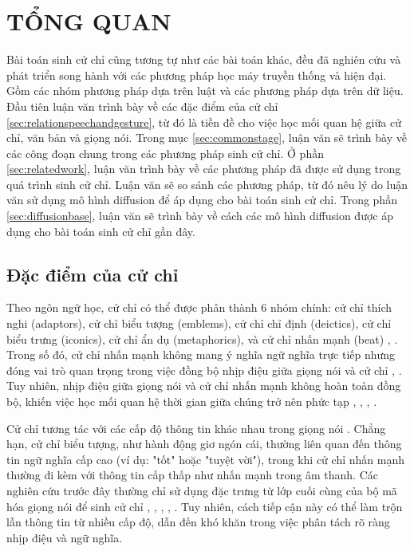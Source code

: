 \chapter{TỔNG QUAN}
\label{Chapter2}

Bài toán sinh cử chỉ cũng tương tự như các bài toán khác, đều đã nghiên cứu và phát triển song hành với các phương pháp học máy truyền thống và hiện đại. Gồm các nhóm phương pháp dựa trên luật và các phương pháp dựa trên dữ liệu.  Đầu tiên luận văn trình bày về các đặc điểm của cử chỉ \autoref{sec:relationspeechandgesture}, từ đó là tiền đề cho việc học mối quan hệ giữa cử chỉ, văn bản và giọng nói. Trong mục \autoref{sec:commonstage}, luận văn sẽ trình bày về các công đoạn chung trong các phương pháp sinh cử chỉ.
Ở phần \autoref{sec:relatedwork}, luận văn trình bày về các phương pháp đã được sử dụng trong quá trình sinh cử chỉ. Luận văn sẽ so sánh các phương pháp, từ đó nêu lý do luận văn sử dụng mô hình diffusion để áp dụng cho bài toán sinh cử chỉ.
Trong phần \autoref{sec:diffusionbase}, luận văn sẽ trình bày về cách các mô hình diffusion được áp dụng cho bài toán sinh cử chỉ gần đây.

\section{Đặc điểm của cử chỉ}
\label{sec:relationspeechandgesture}

Theo ngôn ngữ học, cử chỉ có thể được phân thành 6 nhóm chính: cử chỉ thích nghi (adaptors), cử chỉ biểu tượng (emblems), cử chỉ chỉ định (deictics), cử chỉ biểu trưng (iconics), cử chỉ ẩn dụ (metaphorics), và cử chỉ nhấn mạnh (beat) \cite{ekman1969repertoire}, \cite{sebeok2011advances}. Trong số đó, cử chỉ nhấn mạnh không mang ý nghĩa ngữ nghĩa trực tiếp nhưng đóng vai trò quan trọng trong việc đồng bộ nhịp điệu giữa giọng nói và cử chỉ \cite{kipp2005gesture}, \cite{sebeok2011advances}. Tuy nhiên, nhịp điệu giữa giọng nói và cử chỉ nhấn mạnh không hoàn toàn đồng bộ, khiến việc học mối quan hệ thời gian giữa chúng trở nên phức tạp \cite{mcclave1994gestural}, \cite{bhattacharya2021speech2affectivegestures}, \cite{kucherenko2020gesticulator}, \cite{yoon2020speech}.

Cử chỉ tương tác với các cấp độ thông tin khác nhau trong giọng nói \cite{sebeok2011advances}. Chẳng hạn, cử chỉ biểu tượng, như hành động giơ ngón cái, thường liên quan đến thông tin ngữ nghĩa cấp cao (ví dụ: "tốt" hoặc "tuyệt vời"), trong khi cử chỉ nhấn mạnh thường đi kèm với thông tin cấp thấp như nhấn mạnh trong âm thanh. Các nghiên cứu trước đây thường chỉ sử dụng đặc trưng từ lớp cuối cùng của bộ mã hóa giọng nói để sinh cử chỉ \cite{alexanderson2020style}, \cite{bhattacharya2021speech2affectivegestures}, \cite{kucherenko2021large}, \cite{qian2021speech}, \cite{yoon2022genea}. Tuy nhiên, cách tiếp cận này có thể làm trộn lẫn thông tin từ nhiều cấp độ, dẫn đến khó khăn trong việc phân tách rõ ràng nhịp điệu và ngữ nghĩa.

